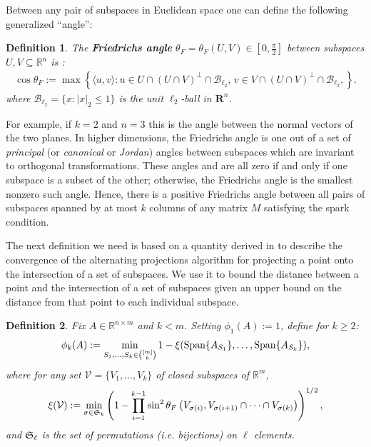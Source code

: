 \documentclass[journal, onecolumn]{IEEEtran}
\newtheorem{definition}{Definition}
\begin{document}
Between any pair of subspaces in Euclidean space one can define the following generalized ``angle'':
\begin{definition}\label{FriedrichsDefinition}
The \textbf{Friedrichs angle} $\theta_F = \theta_F(U,V) \in [0,\frac{\pi}{2}]$ between subspaces $U,V \subseteq \mathbb{R}^n$ is \cite{Deutsch}:
\begin{align}
\cos{\theta_F} := \max\left\{ \langle u, v \rangle: u \in U \cap (U \cap V)^\perp \cap \mathcal{B}_{\ell_2}, \, v \in V \cap (U \cap V)^\perp \cap \mathcal{B}_{\ell_2}, \right\}.
\end{align}
%
where $\mathcal{B}_{\ell_2} = \{ x: |x|_2 \leq 1\}$ is the unit $\ell_2$-ball in $\mathbf{R}^n$.
\end{definition}
For example, if $k=2$ and $n=3$ this is the angle between the normal vectors of the two planes. In higher dimensions, the Friedrichs angle is one out of a set of \textit{principal} (or \textit{canonical} or \textit{Jordan}) angles between subspaces which are invariant to orthogonal transformations. These angles and are all zero if and only if one subspace is a subset of the other; otherwise, the Friedrichs angle is the smallest nonzero such angle. Hence, there is a positive Friedrichs angle between all pairs of subspaces spanned by at most $k$ columns of any matrix $M$ satisfying the spark condition. 

The next definition we need is based on a quantity derived in \cite{Deutsch} to describe the convergence of the alternating projections algorithm for projecting a point onto the intersection of a set of subspaces. We use it to bound the distance between a point and the intersection of a set of subspaces given an upper bound on the distance from that point to each individual subspace.

\begin{definition}\label{SpecialSupportSet}
Fix $A \in \mathbb{R}^{n \times m}$ and $k < m$. Setting $\phi_1(A) := 1$, define for $k \geq 2$:
\begin{align}\label{rho}
\phi_k(A) := \min_{ S_1,\ldots,S_k \in {[m] \choose k} } 1 - \xi( \text{\rm Span}\{A_{S_1}\}, \ldots,  \text{\rm Span}\{A_{S_k}\}),
\end{align}
where for any set $\mathcal{V} = \{V_1, \ldots, V_k\}$ of closed subspaces of $\mathbb{R}^m$, 
\begin{align}
\xi(\mathcal{V}) := \min_{\sigma \in \frak{S}_k} \left(1 - \prod_{i=1}^{k-1} \sin^2  \theta_F \left(V_{\sigma(i)}, V_{\sigma(i+1)} \cap \cdots \cap V_{\sigma(k)}\right)  \right)^{1/2},
\end{align}
%
and $\frak{S}_{\ell}$ is the set of permutations (i.e. bijections) on $\ell$ elements. 
\end{definition}
\end{document}
